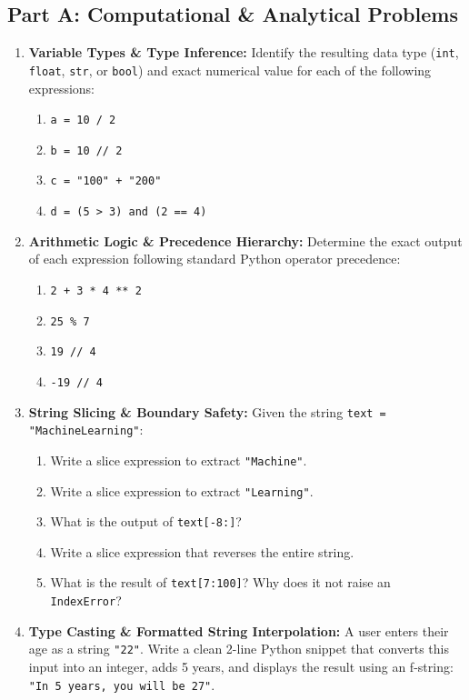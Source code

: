 \subsection*{Part A: Computational \& Analytical Problems}
\begin{enumerate}
\item \textbf{Variable Types \& Type Inference:} Identify the resulting data type (\texttt{int}, \texttt{float}, \texttt{str}, or \texttt{bool}) and exact numerical value for each of the following expressions:
\begin{enumerate}
    \item \texttt{a = 10 / 2}
    \item \texttt{b = 10 // 2}
    \item \texttt{c = "100" + "200"}
    \item \texttt{d = (5 > 3) and (2 == 4)}
\end{enumerate}

\item \textbf{Arithmetic Logic \& Precedence Hierarchy:} Determine the exact output of each expression following standard Python operator precedence:
\begin{enumerate}
    \item \texttt{2 + 3 * 4 ** 2}
    \item \texttt{25 \% 7}
    \item \texttt{19 // 4}
    \item \texttt{-19 // 4}
\end{enumerate}

\item \textbf{String Slicing \& Boundary Safety:} Given the string \texttt{text = "MachineLearning"}:
\begin{enumerate}
    \item Write a slice expression to extract \texttt{"Machine"}.
    \item Write a slice expression to extract \texttt{"Learning"}.
    \item What is the output of \texttt{text[-8:]}?
    \item Write a slice expression that reverses the entire string.
    \item What is the result of \texttt{text[7:100]}? Why does it not raise an \texttt{IndexError}?
\end{enumerate}

\item \textbf{Type Casting \& Formatted String Interpolation:} A user enters their age as a string \texttt{"22"}. Write a clean 2-line Python snippet that converts this input into an integer, adds 5 years, and displays the result using an f-string: \texttt{"In 5 years, you will be 27"}.


\end{enumerate}

